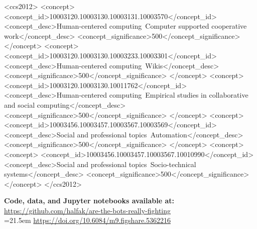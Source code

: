 \documentclass[format=acmsmall, review=false, screen=true]{acmart}%
\begin{document}
%
%
\begin{CCSXML}
<ccs2012>
<concept>
<concept_id>10003120.10003130.10003131.10003570</concept_id>
<concept_desc>Human-centered computing~Computer supported cooperative work</concept_desc>
<concept_significance>500</concept_significance>
</concept>
<concept>
<concept_id>10003120.10003130.10003233.10003301</concept_id>
<concept_desc>Human-centered computing~Wikis</concept_desc>
<concept_significance>500</concept_significance>
</concept>
<concept>
<concept_id>10003120.10003130.10011762</concept_id>
<concept_desc>Human-centered computing~Empirical studies in collaborative and social computing</concept_desc>
<concept_significance>500</concept_significance>
</concept>
<concept>
<concept_id>10003456.10003457.10003567.10003569</concept_id>
<concept_desc>Social and professional topics~Automation</concept_desc>
<concept_significance>500</concept_significance>
</concept>
<concept>
<concept>
<concept_id>10003456.10003457.10003567.10010990</concept_id>
<concept_desc>Social and professional topics~Socio-technical systems</concept_desc>
<concept_significance>500</concept_significance>
</concept>
</ccs2012>
\end{CCSXML}

%
%





\maketitle
\renewcommand{\shortauthors}{Geiger \& Halfaker}
\small
\textbf{Code, data, and Jupyter notebooks available at:} \url{https://github.com/halfak/are-the-bots-really-fighting}
\\
\hangindent=21.5em
 \url{https://doi.org/10.6084/m9.figshare.5362216}
\normalsize
\end{document}
